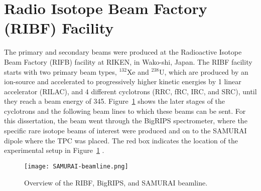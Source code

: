 \begin{comment}
\subsection{Considerations when constructing a TPC}
Several considerations went into the construction of the S$\pi$RI TPC which I wish to summarize and document here. All materials and glues of the TPC were selected as low out-gassing materials. Several materials (that are common place in nuclear labs), such as vacuum grease, Viton o-rings, all out-gas organic chemicals into the counter gas which damage the TPC by permanently lowering the gain over time. The organic molecules responsible are difficult to identify exactly, but lists of good and bad materials are well known in the literature from experiments. If a material we wished to used was not on these lists we placed the material in a clean chamber with the counter gas and flowed this counter gas through a small proportional counter making sure the gain did not drop at high collection rates when exposed to a high rate alpha Americium source. 

Sparking
Two volumes of gas. 
\end{comment}


\section{Radio Isotope Beam Factory (RIBF) Facility }
The primary and secondary beams were produced at the Radioactive Isotope Beam Factory (RIFB) facility at RIKEN, in Wako-shi, Japan. The RIBF facility starts with two primary beam types, ${}^{132}$Xe and ${}^{238}$U, which are produced by an ion-source and accelerated to progressively higher kinetic energies by 1 linear accelerator (RILAC), and 4 different cyclotrons (RRC, fRC, IRC, and SRC), until they reach a beam energy of \SI{345}{\MeVA}. Figure~\ref{fig:samuraiBeamLine} shows the later stages of the cyclotrons and the following beam lines to which these beams can be sent. For this dissertation, the beam went through the BigRIPS spectrometer, where the specific rare isotope beams of interest were produced and on to the SAMURAI dipole where the  \spirit TPC was placed. The red box indicates the location of the experimental setup in Figure~\ref{fig:samuraiBeamLine} .


\begin{figure}[!htb]
\texttt{[image: SAMURAI-beamline.png]}
\caption{Overview of the RIBF, BigRIPS, and SAMURAI beamline.}
\label{fig:samuraiBeamLine}
\end{figure}

